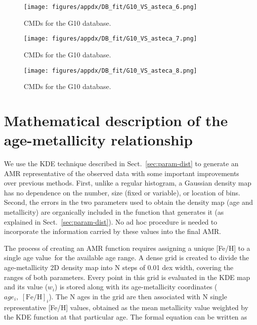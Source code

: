 \documentclass{aa}
\begin{document}
\begin{appendix}
\begin{figure*}
\texttt{[image: figures/appdx/DB\_fit/G10\_VS\_asteca\_6.png]}
\caption{CMDs for the G10 database.}
\label{fig:DBs_G10_6}
\end{figure*}
\clearpage

\begin{figure*}
\texttt{[image: figures/appdx/DB\_fit/G10\_VS\_asteca\_7.png]}
\caption{CMDs for the G10 database.}
\label{fig:DBs_G10_7}
\end{figure*}
\clearpage

\begin{figure}
\centering
\texttt{[image: figures/appdx/DB\_fit/G10\_VS\_asteca\_8.png]}
\caption{CMDs for the G10 database.}
\label{fig:DBs_G10_8}
\end{figure}





\section{Mathematical description of the age-metallicity relationship}
\label{apdx:amr_description}

We use the KDE technique described in Sect.~\ref{sec:param-dist} to
generate an AMR representative of the observed data with some important
improvements over previous methods.
%
First, unlike a regular histogram, a Gaussian density map has no dependence on
the number, size (fixed or variable), or location of bins.
Second, the errors in the two parameters used to obtain the density map (age and
metallicity) are organically included in the function that generates it
(as explained in Sect.~\ref{sec:param-dist}). No ad hoc procedure is needed to
incorporate the information carried by these values into the final AMR.\@

The process of creating an AMR function
requires assigning a unique [Fe/H] to a single age value\ for the available age
range.
%
A dense grid is created to divide the age-metallicity 2D density map into N
steps of 0.01 dex width, covering the ranges of both parameters. Every point in
this grid is evaluated in the KDE map and its value ($w_{i}$) is stored along
with its age-metallicity coordinates ($age_{i},\;[\mathrm{Fe/H}]_{i}$).
%
The N ages in the grid are then associated with N single representative [Fe/H]
values, obtained as the mean metallicity value weighted by the KDE function at
that particular age. The formal equation can be written as


\end{appendix}
\end{document}
